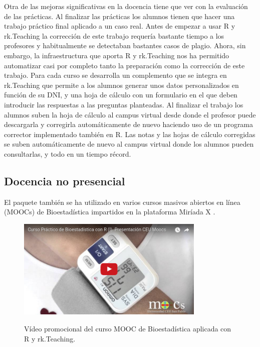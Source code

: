 \documentclass[a4paper,10pt,twoside]{article}
\newcommand{\rkteaching}{\textsf{rk.Teaching}}
\begin{document}
Otra de las mejoras significativas en la docencia tiene que ver con la evaluación de las prácticas.
Al finalizar las prácticas los alumnos tienen que hacer una trabajo práctico final aplicado a un caso real.
Antes de empezar a usar R y \rkteaching{} la corrección de este trabajo requería bastante tiempo a los profesores y
habitualmente se detectaban bastantes casos de plagio.
Ahora, sin embargo, la infraestructura que aporta R y \rkteaching{} nos ha permitido automatizar casi por completo tanto
la preparación como la corrección de este trabajo. 
Para cada curso se desarrolla un complemento que se integra en \rkteaching{} que permite a los alumnos generar unos
datos personalizados en función de su DNI, y una hoja de cálculo con un formulario en el que deben introducir las respuestas a
las preguntas planteadas.
Al finalizar el trabajo los alumnos suben la hoja de cálculo al campus virtual desde donde el profesor puede
descargarla y corregirla automáticamente de nuevo haciendo uso de un programa corrector implementado también en R.
Las notas y las hojas de cálculo corregidas se suben automáticamente de nuevo al campus virtual donde los alumnos pueden
consultarlas, y todo en un tiempo récord. 

\subsection{Docencia no presencial}
El paquete también se ha utilizado en varios cursos masivos abiertos en línea (MOOCs) de Bioestadística impartidos
en la plataforma Miríada X \cite{sanchez2013curso}.

\begin{figure}[htp]
\begin{center}
\href{https://youtu.be/BTFOsbzInZo}{\includegraphics[width=0.8\textwidth]{img/mooc.png}}
\caption{Vídeo promocional del curso MOOC de Bioestadística aplicada con R y rk.Teaching.}
\label{f:mooc}
\end{center}
\end{figure}
\end{document}
